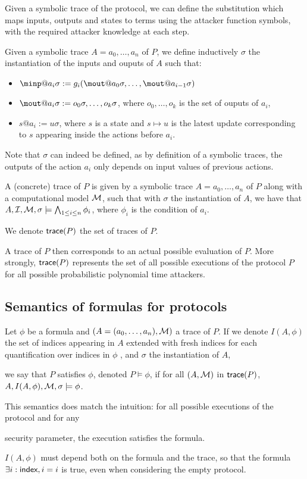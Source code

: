 Given a symbolic trace of the protocol, we can define the substitution which 
maps inputs, outputs and states to terms using the attacker function symbols, 
with the required attacker knowledge at each step.

\begin{definition}
  Given a symbolic trace $A = a_0,\dots,a_n$ of $P$, we define inductively 
  $\sigma$ the instantiation of the inputs and ouputs of $A$ such that:
  \begin{itemize}
  \item $\minp@a_i\sigma := g_i( \mout@a_0\sigma,\dots,\mout@a_{i-1}\sigma  ) $
  \item $\mout@a_i\sigma := o_0\sigma, \dots, o_k\sigma$, where 
    $o_0,\dots,o_k$ is the set of ouputs of  $a_i$,
  \item $s@a_i := u\sigma$, where $s$ is a state and $s \mapsto u$ is the 
      latest update corresponding to $s$ appearing inside the actions before 
      $a_i$.
\end{itemize}
\end{definition}
Note that $\sigma$ can indeed be defined, as by definition of a symbolic 
traces, the outputs of the action $a_i$ only depends on input values of 
previous actions.

\begin{definition}
  A (concrete) trace of $P$ is given by a symbolic trace $A = a_0,\dots,a_n$ 
  of $P$ along with a computational model $\mathcal{M}$, such that with $\sigma$ the 
  instantiation of $A$, we have that $A,\mathcal{I},\mathcal{M},\sigma \models \bigwedge_{1\leq 
  i \leq n} \phi_i$, where $\phi_i$ is the condition of $a_i$.

  We denote $\textsf{trace}(P)$ the set of traces of $P$.
\end{definition}

A trace of $P$ then corresponds to an actual possible evaluation of $P$. More 
strongly, $\textsf{trace}(P)$ represents the set of all possible executions of the 
protocol $P$ for all possible probabilistic polynomial time attackers.

\subsection{Semantics of formulas for protocols}

\begin{definition}
  Let $\phi$ be a formula and $(A=(a_0,\dots,a_n),\mathcal{M})$ a trace of $P$. If we 
  denote $I(A,\phi)$ the set of indices appearing in $A$ extended with fresh 
  indices for each quantification over indices in $\phi$ , and $\sigma$ the 
  instantiation of $A$,

we say that $P$ satisfies $\phi$, denoted $P \models \phi$, if for all 
  $(A,\mathcal{M})$ in $\textsf{trace}(P)$, $A, I(A,\phi), \mathcal{M}, \sigma \models \phi$.

\end{definition}

This semantics does match the intuition: for all possible executions of the 
protocol and for any

security parameter, the execution satisfies the formula.

$I(A,\phi)$ must depend both on the formula and the trace, so that the formula 
$\exists i:\textsf{index}, i=i$ is true, even when considering the empty protocol.
